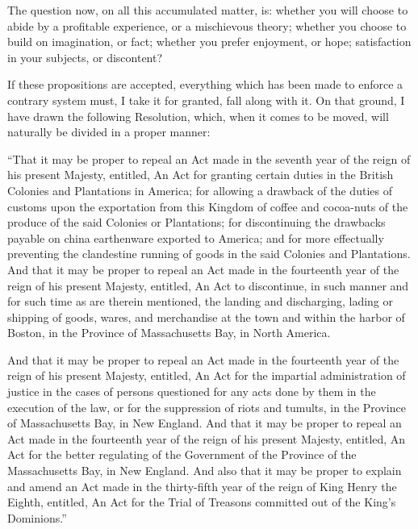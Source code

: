 The question now, on all this accumulated matter, is: whether you will choose to abide by a profitable experience, or a mischievous theory; whether you choose to build on imagination, or fact; whether you prefer enjoyment, or hope; satisfaction in your subjects, or discontent?\par

If these propositions are accepted, everything which has been made to enforce a contrary system must, I take it for granted, fall along with it. On that ground, I have drawn the following Resolution, which, when it comes to be moved, will naturally be divided in a proper manner:\par

“That it may be proper to repeal an Act made in the seventh year of the reign of his present Majesty, entitled, An Act for granting certain duties in the British Colonies and Plantations in America; for allowing a drawback of the duties of customs upon the exportation from this Kingdom of coffee and cocoa-nuts of the produce of the said Colonies or Plantations; for discontinuing the drawbacks payable on china earthenware exported to America; and for more effectually preventing the clandestine running of goods in the said Colonies and Plantations. And that it may be proper to repeal an Act made in the fourteenth year of the reign of his present Majesty, entitled, An Act to discontinue, in such manner and for such time as are therein mentioned, the landing and discharging, lading or shipping of goods, wares, and merchandise at the town and within the harbor of Boston, in the Province of Massachusetts Bay, in North America.\par

And that it may be proper to repeal an Act made in the fourteenth year of the reign of his present Majesty, entitled, An Act for the impartial administration of justice in the cases of persons questioned for any acts done by them in the execution of the law, or for the suppression of riots and tumults, in the Province of Massachusetts Bay, in New England. And that it may be proper to repeal an Act made in the fourteenth year of the reign of his present Majesty, entitled, An Act for the better regulating of the Government of the Province of the Massachusetts Bay, in New England. And also that it may be proper to explain and amend an Act made in the thirty-fifth year of the reign of King Henry the Eighth, entitled, An Act for the Trial of Treasons committed out of the King’s Dominions.”\par

